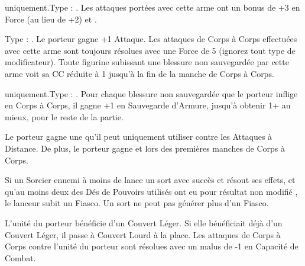 {{{{{{{{\closearmynewsection

\startarmymagicalitems

\armymagicalweapons

\startpricelist

\infantry{} uniquement.\newline Type : \gw{}. Les attaques portées avec cette arme ont un bonus de +3 en Force (au lieu de +2) et .

Type : \hw{}. Le porteur gagne +1 Attaque. Les attaques de Corps à Corps effectuées avec cette arme sont toujours résolues avec une Force de 5 (ignorez tout type de modificateur). Toute figurine subissant une blessure non sauvegardée par cette arme voit sa CC réduite à 1 jusqu'à la fin de la manche de Corps à Corps.

\endpricelist

\armymagicalarmour

\startpricelist

\infantry{} uniquement.\newline Type : \ha{}. Pour chaque blessure non sauvegardée que le porteur inflige en Corps à Corps, il gagne +1 en Sauvegarde d'Armure, jusqu'à obtenir 1+ au mieux, pour le reste de la partie.

\endpricelist

\armytalismans

\startpricelist

Le porteur gagne une  qu'il peut uniquement utiliser contre les Attaques à Distance. De plus, le porteur gagne  et  lors des premières manches de Corps à Corps.

Si un Sorcier ennemi à moins de  lance un sort avec succès et résout ses effets, et qu'au moins deux des Dés de Pouvoirs utilisés ont eu pour résultat non modifié , le lanceur subit un Fiasco. Un sort ne peut pas générer plus d'un Fiasco.

\endpricelist

\armyenchanteditems

\startpricelist

L'unité du porteur bénéficie d'un Couvert Léger. Si elle bénéficiait déjà d'un Couvert Léger, il passe à Couvert Lourd à la place. Les attaques de Corps à Corps contre l'unité du porteur sont résolues avec un malus de -1 en Capacité de Combat.

}}}}}}}}
